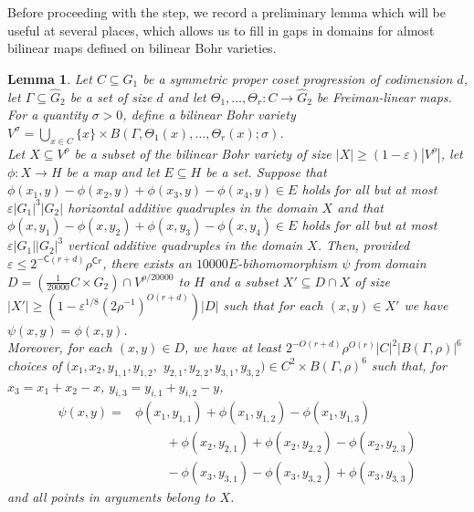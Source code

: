 \documentclass[a4paper,11pt]{article}
\numberwithin{theorem}{section}
\newtheorem{lemma}[theorem]{Lemma}
\theoremstyle{definition}
\newcommand{\blc}{\bm{\mathsf{C}}}
\begin{document}
\vspace{\baselineskip}

Before proceeding with the step, we record a preliminary lemma which will be useful at several places, which allows us to fill in gaps in domains for almost bilinear maps defined on bilinear Bohr varieties.\\

\begin{lemma}\label{almostfullbilinearmap}
    Let $C \subseteq G_1$ be a symmetric proper coset progression of codimension $d$, let $\Gamma \subseteq \hat{G}_2$ be a set of size $d$ and let $\Theta_1, \dots, \Theta_r : C \to \hat{G}_2$ be Freiman-linear maps. For a quantity $\sigma > 0$, define a bilinear Bohr variety $V^\sigma = \bigcup_{x \in C} \{x\} \times B(\Gamma, \Theta_1(x), \dots, \Theta_r(x); \sigma)$.\\
    \indent Let $X \subseteq V^\rho$ be a subset of the bilinear Bohr variety of size $|X| \geq (1-\varepsilon)|V^\rho|$, let $\phi : X \to H$ be a map and let $E \subseteq H$ be a set. Suppose that $\phi(x_1, y) - \phi(x_2, y) + \phi(x_3, y) - \phi(x_4, y) \in E$ holds for all but at most $\varepsilon |G_1|^3|G_2|$ horizontal additive quadruples in the domain $X$ and that $\phi(x, y_1) - \phi(x, y_2) + \phi(x, y_3) - \phi(x, y_4) \in E$ holds for all but at most $\varepsilon |G_1||G_2|^3$ vertical additive quadruples in the domain $X$. Then, provided $\varepsilon \leq 2^{-\blc(r + d)}\rho^{\blc r}$, there exists an $10000E$-bihomomorphism $\psi$ from domain $D = (\frac{1}{20000}C \times G_2) \cap V^{\rho/20000}$ to $H$ and a subset $X' \subseteq D \cap X$ of size $|X'| \geq (1 - \varepsilon^{1/8} (2\rho^{-1})^{O(r + d)})|D|$ such that for each $(x,y) \in X'$ we have $\psi(x,y) = \phi(x,y)$. \\
    \indent Moreover, for each $(x,y) \in D$, we have at least $2^{-O(r + d)} \rho^{O(r)}|C|^2|B(\Gamma, \rho)|^6$ choices of $(x_1, x_2, y_{1,1}, y_{1,2},$ $y_{2,1}, y_{2,2}, y_{3,1}, y_{3,2}) \in C^2 \times B(\Gamma, \rho)^6$ such that, for $x_3 = x_1 + x_2 - x$, $y_{i, 3} = y_{i, 1} + y_{i, 2} - y$,
    \begin{align}\psi(x,y) =& \phi(x_1, y_{1,1}) + \phi(x_1, y_{1,2}) - \phi(x_1, y_{1,3}) \nonumber\\
    &\hspace{1cm} + \phi(x_2, y_{2,1}) + \phi(x_2, y_{2,2}) - \phi(x_2, y_{2,3})\nonumber\\
    &\hspace{1cm} -  \phi(x_3, y_{3,1}) - \phi(x_3, y_{3,2}) + \phi(x_3, y_{3,3})\label{technicalextensionverydense}\end{align}
    and all points in arguments belong to $X$.
\end{lemma}
\end{document}
